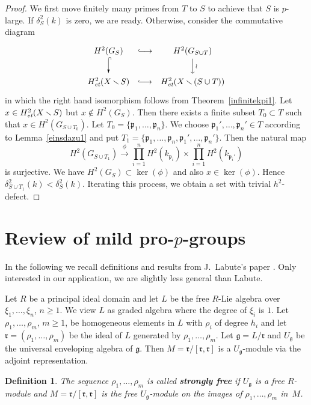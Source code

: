 \documentclass[10pt]{article}
\def\mapr#1{\stackrel{#1}{\longrightarrow}}
\def\mapd#1{\Big\downarrow\rlap {$\vcenter{\hbox{$\scriptstyle{{#1}}$}}$}}
\def\injr#1{\stackrel{#1}{\lhook\joinrel\relbar\joinrel\rightarrow}}
\def\injd#1{
 \setlength{\unitlength}{0.1pt}
 \begin{picture}(40,120)
 \put(20,102){\vector(0,-1){158}} \put(12.5,100){\mbox{$\scriptscriptstyle
 \cap $}} \put(47,10){\mbox{$\scriptstyle #1 $}}
 \end{picture}}
\newcommand{\p}{{\mathfrak p}}
\newcommand{\sm}{{\,\smallsetminus\,}}
\newcommand{\et}{\text{\it et}}
\newcommand{\g}{\mathfrak{g}}
\renewcommand{\r}{\mathfrak{r}}
\theoremstyle{alex}
\theoremstyle{alexdef}
\newtheorem*{definition}{Definition}
\begin{document}
\begin{proof}
We first move finitely many primes from $T$ to $S$ to achieve that $S$ is $p$-large. If $\delta^2_S(k)$ is zero, we are ready. Otherwise, consider the commutative diagram
\[
\renewcommand{\arraystretch}{1.5}
\begin{array}{ccc}
H^2(G_S)& \injr{}& H^2(G_{S\cup T})\\
\injd{}&&\mapd{\wr}\\
H^2_\et(X\sm S)&\injr{}& H^2_\et(X\sm (S\cup T))\\
\end{array}
\renewcommand{\arraystretch}{1}
\]
in which the right hand isomorphism follows from Theorem~\ref{infinitekpi1}. Let $x \in H^2_\et(X\sm S)$ but $x\notin H^2(G_S)$. Then there exists a finite subset $T_0 \subset T$ such that $x\in H^2(G_{S\cup T_0})$. Let $T_0=\{\p_1,\ldots,\p_n\}$. We choose $\p_1',\ldots,\p_n'\in T$ according to Lemma~\ref{einsdazu1} and put $T_1= \{\p_1,\ldots,\p_n, \p_1',\ldots,\p_n'\}$.
Then the natural map
\[
H^2(G_{S\cup T_1}) \mapr{\phi} \prod_{i=1}^n H^2(k_{\p_i}) \times \prod_{i=1}^n H^2(k_{\p_i'})
\]
is surjective. We have $H^2(G_S) \subset \ker(\phi)$ and also $x\in \ker(\phi)$. Hence
$\delta^2_{S\cup T_1}(k) < \delta^2_S(k)$. Iterating this process, we obtain a set with trivial $h^2$-defect.
\end{proof}

\section{\boldmath Review of mild pro-$p$-groups}

In the following we recall definitions and results from J.~Labute's paper \cite{La}. Only interested in our application, we are slightly less general than Labute.

\medskip
Let $R$ be a principal ideal domain and let $L$ be the free $R$-Lie algebra over $\xi_1,\ldots,\xi_n$, $n\geq 1$. We view $L$ as graded algebra where the degree of $\xi_i$ is $1$.
Let $\rho_1,\ldots,\rho_m$, $m\geq 1$, be homogeneous elements in $L$ with $\rho_i$ of degree $h_i$ and let $\r=(\rho_1,\ldots,\rho_m)$ be the ideal of $L$ generated by $\rho_1,\ldots,\rho_m$. Let $\g=L/\r$ and $U_\g$ be the universal enveloping algebra of $\g$.
Then $M=\r/[\r,\r]$ is a $U_\g$-module via the adjoint representation.

\begin{definition}
The sequence $\rho_1,\ldots,\rho_m$ is called {\bf strongly free} if $U_\g$ is a free $R$-module and $M=\r/[\r,\r]$ is the free $U_\g$-module on the images of $\rho_1,\ldots,\rho_m$ in~$M$.
\end{definition}
\end{document}
